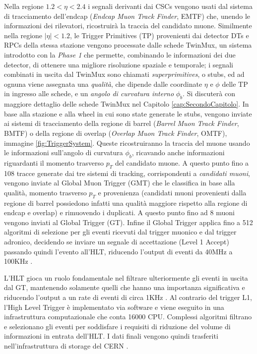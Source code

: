 Nella regione $1.2 < \eta < 2.4$ i segnali derivanti dai CSCs vengono usati dal sistema di tracciamento dell'endcap (\textit{Endcap Muon Track Finder}, EMTF) che, unendo le informazioni dei rilevatori, ricostruirà la traccia del candidato muone.\newline
Similmente nella regione $|\eta| < 1.2$, le Trigger Primitives (TP) provenienti dai detector DTs e RPCs della stessa stazione vengono processate dalle schede TwinMux, un sistema introdotto con la \textit{Phase 1} che permette, combinando le informazioni dei due detector, di ottenere una migliore risoluzione spaziale e temporale; i segnali combinati in uscita dal TwinMux sono chiamati \textit{superprimitives}, o stubs, ed ad ognuna viene assegnata una \textit{qualità}, che dipende dalle coordinate $\eta$ e $\phi$ delle TP in ingresso alle schede, e un \textit{angolo di curvatura interno} $\phi_b$. 
Si discuterà con maggiore dettaglio delle schede TwinMux nel Capitolo \ref{cap:SecondoCapitolo}. \newline
In base alla stazione e alla wheel in cui sono state generate le stubs, vengono inviate ai sistemi di tracciamento della regione di barrel (\textit{Barrel Muon Track Finder}, BMTF) o della regione di overlap (\textit{Overlap Muon Track Finder}, OMTF), immagine \ref{fig:TriggerSystem}. Queste  ricostruiranno la traccia del muone usando le informazioni sull'angolo di curvatura $\phi_b$, ricavando anche informazioni riguardanti il momento trasverso $p_T$ del candidato muone. \newline
A questo punto fino a 108 tracce generate dai tre sistemi di tracking, corrispondenti a \textit{candidati muoni}, vengono inviate al Global Muon Trigger (GMT) che le classifica in base alla qualità, momento trasverso $p_T$ e provenienza (candidati muoni provenienti dalla regione di barrel possiedono infatti una qualità maggiore rispetto alla regione di endcap e overlap) e rimuovendo i duplicati. A questo punto fino ad 8 muoni vengono inviati al Global Trigger (GT). \newline
Infine il Global Trigger applica fino a 512 algoritmi di selezione per gli eventi ricevuti dal trigger muonico e dal trigger adronico, decidendo se inviare un segnale di accettazione (Level 1 Accept) passando quindi l'evento all'HLT, riducendo l'output di eventi da 40MHz a 100KHz \cite{CERNsummerSchool}.

L'HLT gioca un ruolo fondamentale nel filtrare ulteriormente gli eventi in uscita dal GT, mantenendo solamente quelli che hanno una importanza significativa e riducendo l'output a un rate di eventi di circa 1KHz . Al contrario del trigger L1, l'High Level Trigger è implementato via software e viene eseguito in una infrastruttura computazionale che conta 16000 CPU. \newline
Complessi algoritmi filtrano e selezionano gli eventi per soddisfare i requisiti di riduzione del volume di informazioni in entrata dell'HLT. I dati finali vengono quindi trasferiti nell'infrastruttura di storage del CERN \cite{MasterThesisNicLai}.


